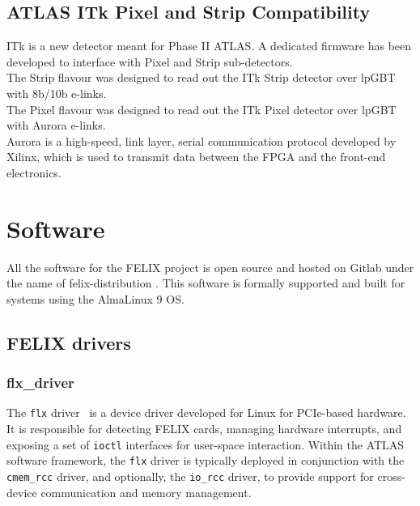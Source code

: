 \subsection{\acs{ATLAS} \acs{ITk} Pixel and Strip Compatibility}
\label{subsec:felix-itk}

\acf{ITk} \cite{atlas-itk-pixel-detector} is a new detector meant for Phase II \acs{ATLAS}.
A dedicated firmware has been developed to interface with  Pixel and Strip sub-detectors.\\

The Strip flavour was designed to read out the \acs{ITk} Strip detector over \acs{lpGBT} with 8b/10b e-links.\\
The Pixel flavour was designed to read out the \acs{ITk} Pixel detector over \acs{lpGBT} with Aurora \cite{aurora-protocol} e-links.\\

Aurora \cite{aurora-protocol} is a high-speed, link layer, serial communication protocol developed by Xilinx, which is used to transmit data between the \acs{FPGA} and the front-end electronics.

\clearpage
\section{Software}

All the software for the \acs{FELIX} project is open source and hosted on Gitlab under the name of felix-distribution \cite{felix-distribution}. This software is formally supported and built for systems using the AlmaLinux 9 \acl{OS}.

\subsection{\acs{FELIX} drivers}

\subsubsection{flx\_driver}

The \texttt{flx} driver~\cite{felix-driver} is a device driver developed for Linux for \acs{PCIe}-based hardware. It is responsible for detecting \acs{FELIX} cards, managing hardware interrupts, and exposing a set of \texttt{ioctl} interfaces for user-space interaction. Within the \acs{ATLAS} software framework, the \texttt{flx} driver is typically deployed in conjunction with the \texttt{cmem\_rcc} driver, and optionally, the \texttt{io\_rcc} driver, to provide support for cross-device communication and memory management.

